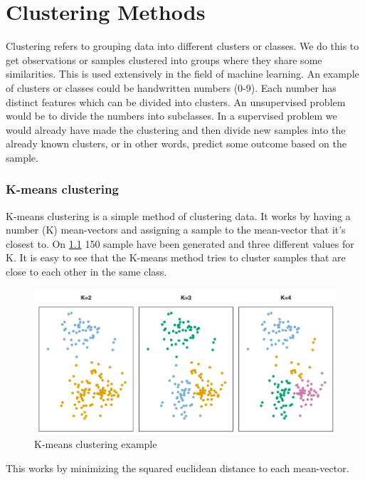 

\chapter{Clustering Methods}
Clustering refers to grouping data into different clusters or classes. We do this to get observations or samples clustered into groups where they share some similarities. This is used extensively in the field of machine learning. An example of clusters or classes could be handwritten numbers (0-9). Each number has distinct features which can be divided into clusters. An unsupervised problem would be to divide the numbers into subclasses. In a supervised problem we would already have made the clustering and then divide new samples into the already known clusters, or in other words, predict some outcome based on the sample.

\subsection{K-means clustering}
K-means clustering is a simple method of clustering data. It works by having a number (K) mean-vectors and assigning a sample to the mean-vector that it's closest to. On \cref{fig:k-means_clustering} 150 sample have been generated and three different values for K. It is easy to see that the K-means method tries to cluster samples that are close to each other in the same class.

\begin{figure}[H]
	\centering
	\includegraphics[width=12cm]{Img/K-means_clustering.PNG}
	\caption{K-means clustering example}
	\label{fig:k-means_clustering}
\end{figure} 

This works by minimizing the squared euclidean distance to each mean-vector. 

